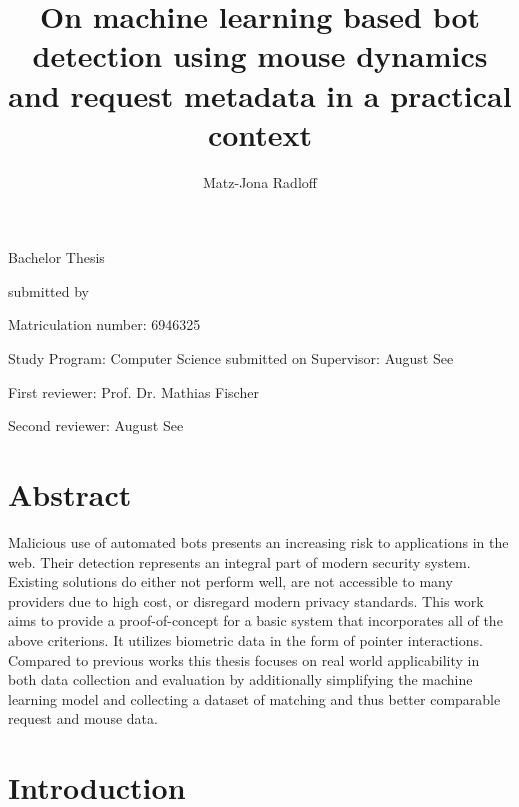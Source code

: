 \documentclass[
    fontsize=12pt,
    headings=small,
    parskip=half,           %
    bibliography=totoc,
    numbers=noenddot,       %
    open=any,               %
    final,                   %
    table
]{scrreprt}
\begin{document}
\title{On machine learning based bot detection using mouse dynamics and request metadata in a practical context}
\author{Matz-Jona Radloff}


\begin{titlepage}
\begin{center}\Large
    \vfill
    Bachelor Thesis
    \vfill
    \makeatletter
    {\Large\textsf{\textbf{\@title}}\par}
    \makeatother
    \vfill
    submitted by
    \par\bigskip
    \makeatletter
    {\@author} \par
    \makeatother
    Matriculation number: 6946325 \par
    Study Program: Computer Science
    \vfill
    \makeatletter
    submitted on {\@date}
    \makeatother
    \vfill
    Supervisor: August See\par
    First reviewer: Prof. Dr. Mathias Fischer \par
    Second reviewer: August See
\end{center}
\end{titlepage}


\chapter*{Abstract}

Malicious use of automated bots presents an increasing risk to applications in the web. Their detection represents an integral part of modern security system. Existing solutions do either not perform well, are not accessible to many providers due to high cost, or disregard modern privacy standards. This work aims to provide a proof-of-concept for a basic system that incorporates all of the above criterions. It utilizes biometric data in the form of pointer interactions. Compared to previous works this thesis focuses on real world applicability in both data collection and evaluation by additionally simplifying the machine learning model and collecting a dataset of matching and thus better comparable request and mouse data.

\tableofcontents

\chapter{Introduction}
\end{document}
